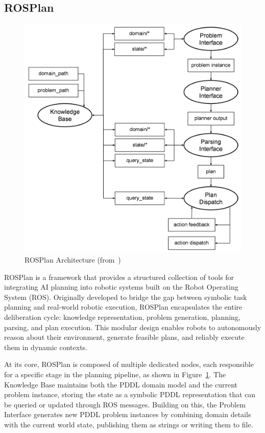 \documentclass[12pt]{extarticle}
\begin{document}
\subsection{ROSPlan}

\begin{figure}[htbp]
    \centering
    \includegraphics[width=\linewidth]{images/ros_plan.png}
    \caption{ROSPlan Architecture (from~\cite{ros-plan})}
    \label{fig:ros-plan}
\end{figure}

ROSPlan is a framework that provides a structured collection of tools for integrating AI planning into robotic systems built on the Robot Operating System (ROS). Originally developed to bridge the gap between symbolic task planning and real-world robotic execution, ROSPlan encapsulates the entire deliberation cycle: knowledge representation, problem generation, planning, parsing, and plan execution. This modular design enables robots to autonomously reason about their environment, generate feasible plans, and reliably execute them in dynamic contexts.

At its core, ROSPlan is composed of multiple dedicated nodes, each responsible for a specific stage in the planning pipeline, as shown in Figure~\ref{fig:ros-plan}. The Knowledge Base maintains both the PDDL domain model and the current problem instance, storing the state as a symbolic PDDL representation that can be queried or updated through ROS messages. Building on this, the Problem Interface generates new PDDL problem instances by combining domain details with the current world state, publishing them as strings or writing them to file.
\end{document}
